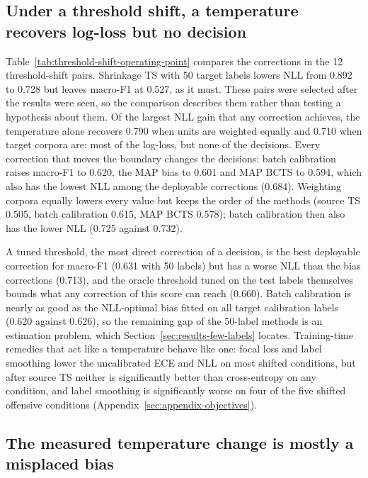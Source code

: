 \subsection{Under a threshold shift, a temperature recovers log-loss but no decision}
\label{sec:results-threshold}

Table~\ref{tab:threshold-shift-operating-point} compares the corrections in the 12 threshold-shift pairs. Shrinkage
TS with 50 target labels lowers NLL from 0.892 to 0.728 but leaves macro-F1 at 0.527, as it must. These pairs were selected after the results
were seen, so the comparison describes them rather than testing a hypothesis about them. Of the largest NLL
gain that any correction achieves, the temperature alone recovers 0.790 when units are weighted equally and 0.710 when
target corpora are: most of the log-loss, but none of the decisions. Every correction that moves the boundary changes
the decisions: batch calibration raises macro-F1 to 0.620, the MAP bias to 0.601 and MAP BCTS to 0.594, which also has
the lowest NLL among the deployable corrections (0.684). Weighting corpora equally lowers every value but keeps the
order of the methods (source TS 0.505, batch calibration 0.615, MAP BCTS 0.578); batch calibration then also has the
lower NLL (0.725 against 0.732).



A tuned threshold, the most direct correction of a decision, is the best deployable correction for macro-F1 (0.631
with 50 labels) but has a worse NLL than the bias corrections (0.713), and the oracle threshold tuned on the test labels themselves bounds what any correction of
this score can reach (0.660). Batch calibration is nearly as good as the NLL-optimal bias fitted on all target
calibration labels (0.620 against 0.626), so the remaining gap of the 50-label methods is an estimation problem, which
Section~\ref{sec:results-few-labels} locates. Training-time remedies that act like a temperature behave like one:
focal loss and label smoothing lower the uncalibrated ECE and NLL on most shifted conditions, but after source TS
neither is significantly better than cross-entropy on any condition, and label smoothing is significantly worse on
four of the five shifted offensive conditions (Appendix~\ref{sec:appendix-objectives}).

\subsection{The measured temperature change is mostly a misplaced bias}
\label{sec:results-decomposition}

